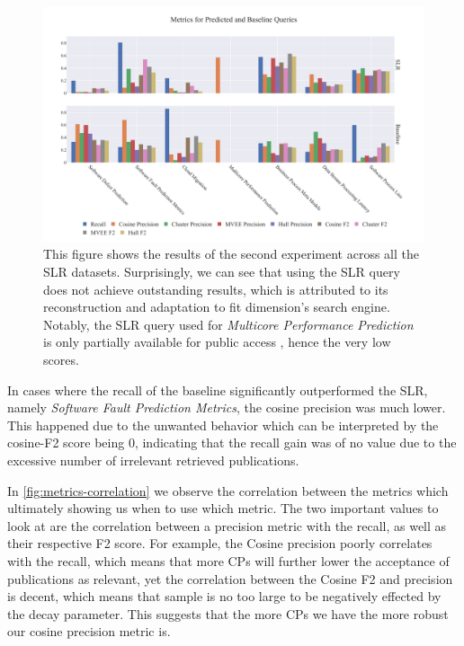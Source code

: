 \begin{figure}[!t]
	\hspace*{-.8cm}		
	\includegraphics[scale=0.45]{pics/all-metrics-2.pdf}
	\caption[Evaluation: Experiment 2]{This figure shows the results of the second experiment across all the SLR datasets. Surprisingly, we can see that using the SLR query does not achieve outstanding results, which is attributed to its reconstruction and adaptation to fit dimension's search engine. Notably, the SLR query used for \textit{Multicore Performance Prediction} is only partially available for public access \autocite{Frank2017}, hence the very low scores.}\label{fig:all-metrics-2}
\end{figure}

In cases where the recall of the baseline significantly outperformed the SLR, namely \textit{Software Fault Prediction Metrics}, the cosine precision was much lower. This happened due to the unwanted behavior which can be interpreted by the cosine-F2 score being 0, indicating that the recall gain was of no value due to the excessive number of irrelevant retrieved publications.

In \autoref{fig:metrics-correlation} we observe the correlation between the metrics which ultimately showing us when to use which metric. The two important values to look at are the correlation between a precision metric with the recall, as well as their respective F2 score. For example, the Cosine precision poorly correlates with the recall, which means that more CPs will further lower the acceptance of publications as relevant, yet the correlation between the Cosine F2 and precision is decent, which means that sample is no too large to be negatively effected by the decay parameter. This suggests that the more CPs we have the more robust our cosine precision metric is.

